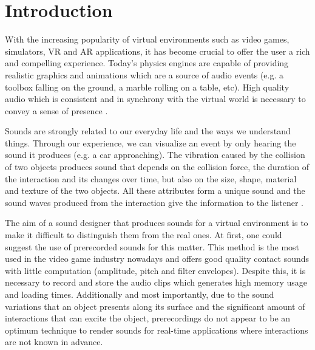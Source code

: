 \chapter{Introduction}

With the increasing popularity of virtual environments such as video games, simulators, \gls{VR} and \gls{AR} applications, it has become crucial to offer the user a rich and compelling experience. Today's physics engines are capable of providing realistic graphics and animations which are a source of audio events (e.g. a toolbox falling on the ground, a marble rolling on a table, etc). High quality audio which is consistent and in synchrony with the virtual world is necessary to convey a sense of presence \cite{larsson2002better}.  

Sounds are strongly related to our everyday life and the ways we understand things. Through our experience, we can visualize an event by only hearing the sound it produces (e.g. a car approaching). The vibration caused by the collision of two objects produces sound that depends on the collision force, the duration of the interaction and its changes over time, but also on the size, shape, material and texture of the two objects. All these attributes form a unique sound and the sound waves produced from the interaction give the information to the listener \cite{gaver1993world}.

The aim of a sound designer that produces sounds for a virtual environment is to make it difficult to distinguish them from the real ones. At first, one could suggest the use of prerecorded sounds for this matter. This method is the most used in the video game industry nowadays and offers good quality contact sounds with little computation (amplitude, pitch and filter envelopes). Despite this, it is necessary to record and store the audio clips which generates high memory usage and loading times. Additionally and most importantly, due to the sound variations that an object presents along its surface and the significant amount of interactions that can excite the object, prerecordings do not appear to be an optimum technique to render sounds for real-time applications where interactions are not known in advance\cite{verron2010synthese, van2001foleyautomatic}. 

